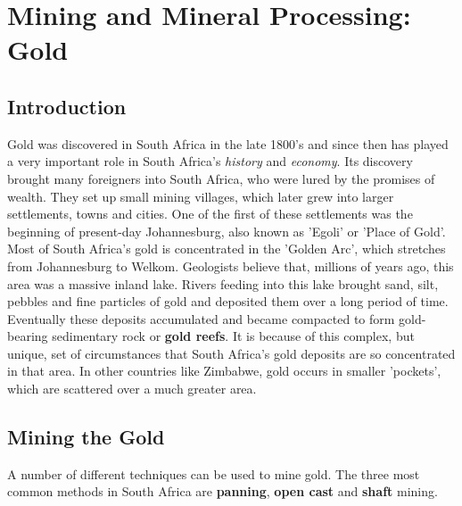 


\section{Mining and Mineral Processing: Gold}

\subsection{Introduction}

Gold was discovered in South Africa in the late 1800's and since then has played a very important role in South Africa's \emph{history} and \emph{economy}. Its discovery brought many foreigners into South Africa, who were lured by the promises of wealth. They set up small mining villages, which later grew into larger settlements, towns and cities. One of the first of these settlements was the beginning of present-day Johannesburg, also known as 'Egoli' or 'Place of Gold'.\\

Most of South Africa's gold is concentrated in the 'Golden Arc', which stretches from Johannesburg to Welkom. Geologists believe that, millions of years ago, this area was a massive inland lake. Rivers feeding into this lake brought sand, silt, pebbles and fine particles of gold and deposited them over a long period of time. Eventually these deposits accumulated and became compacted to form gold-bearing sedimentary rock or \textbf{gold reefs}. It is because of this complex, but unique, set of circumstances that South Africa's gold deposits are so concentrated in that area. In other countries like Zimbabwe, gold occurs in smaller 'pockets', which are scattered over a much greater area.

\subsection{Mining the Gold}

A number of different techniques can be used to mine gold. The three most common methods in South Africa are \textbf{panning}, \textbf{open cast} and \textbf{shaft} mining.

